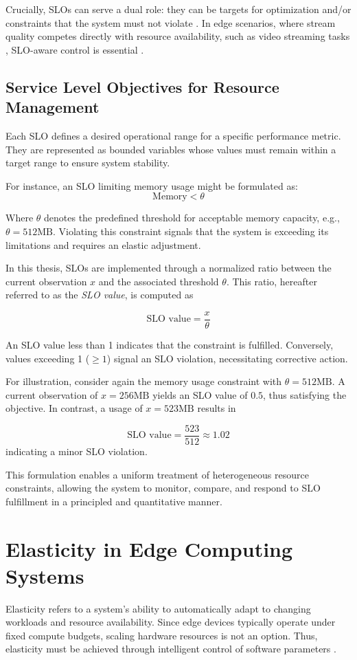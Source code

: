 Crucially, SLOs can serve a dual role: they can be targets for optimization and/or constraints that the
system must not violate \cite{casamayor_pujol_deepslos_2024, sedlak_diffusing_2024}. In edge scenarios, where stream quality competes directly with resource availability, such as video streaming tasks \cite{sedlak_adaptive_2024}, SLO-aware control is essential \cite{sedlak_slo-aware_2025}.


\subsection{Service Level Objectives for Resource Management}

Each SLO defines a desired operational range for a specific performance metric. They are represented as bounded variables whose values must remain within a target range to ensure system stability.

For instance, an SLO limiting memory usage might be formulated as:
\[
\text{Memory} < \theta
\]

Where \(\theta\) denotes the predefined threshold for acceptable memory capacity, e.g., \(\theta = 512\text{MB}\). Violating this constraint signals that the system is exceeding its limitations and requires an elastic adjustment.

In this thesis, SLOs are implemented through a normalized ratio between the current observation $x$ and the associated threshold $\theta$. This ratio, hereafter referred to as the \textit{SLO value}, is computed as

\[
\text{SLO value} = \frac{x}{\theta}
\]

An SLO value less than 1 indicates that the constraint is fulfilled. Conversely, values exceeding 1 
(\(\geq1\)) signal an SLO violation, necessitating corrective action.

For illustration, consider again the memory usage constraint with \(\theta = 512\text{MB}\). A current observation of \(x = 256\text{MB}\) yields an SLO value of \(0.5\), thus satisfying the objective. In contrast, a usage of \(x = 523\text{MB}\) results in

\[
\text{SLO value} = \frac{523}{512} \approx 1.02
\]
indicating a minor SLO violation.

This formulation enables a uniform treatment of heterogeneous resource constraints, allowing the system to monitor, compare, and respond to SLO fulfillment in a principled and quantitative manner.

\section{Elasticity in Edge Computing Systems}
Elasticity refers to a system’s ability to automatically adapt to changing workloads and resource availability. Since edge devices typically operate under fixed compute budgets, scaling hardware resources is not an option. Thus, elasticity must be achieved through intelligent control of software parameters \cite{sedlak_towards_2025}.

